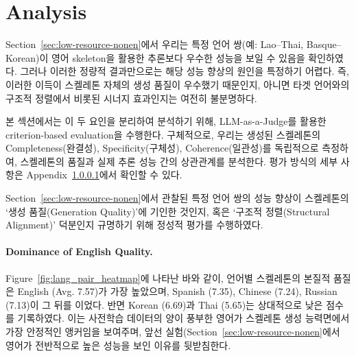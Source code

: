 \section{Analysis}

Section~\ref{sec:low-resource-nonen}에서 우리는 특정 언어 쌍(예: Lao--Thai, Basque--Korean)이 영어 skeleton을 활용한 추론보다 우수한 성능을 보일 수 있음을 확인하였다. 그러나 이러한 정량적 결과만으로는 해당 성능 향상의 원인을 특정하기 어렵다. 즉, 이러한 이득이 스켈레톤 자체의 생성 품질이 우수했기 때문인지, 아니면 타겟 언어와의 구조적 정렬에서 비롯된 시너지 효과인지는 여전히 불분명하다.

본 섹션에서는 이 두 요인을 분리하여 분석하기 위해, LLM-as-a-Judge를 활용한 criterion-based evaluation을 수행한다. 구체적으로, 우리는 생성된 스켈레톤의 Completeness(완결성), Specificity(구체성), Coherence(일관성)를 독립적으로 측정하여, 스켈레톤의 품질과 실제 추론 성능 간의 상관관계를 분석한다. 평가 방식의 세부 사항은 Appendix~\ref{}에서 확인할 수 있다.


Section~\ref{sec:low-resource-nonen}에서 관찰된 특정 언어 쌍의 성능 향상이 스켈레톤의 `생성 품질(Generation Quality)'에 기인한 것인지, 혹은 `구조적 정렬(Structural Alignment)' 덕분인지 규명하기 위해 정성적 평가를 수행하였다.


\paragraph{Dominance of English Quality.} 
Figure~\ref{fig:lang_pair_heatmap}에 나타난 바와 같이, 언어별 스켈레톤의 본질적 품질은 English (Avg. 7.57)가 가장 높았으며, Spanish (7.35), Chinese (7.24), Russian (7.13)이 그 뒤를 이었다. 반면 Korean (6.69)과 Thai (5.65)는 상대적으로 낮은 점수를 기록하였다. 이는 사전학습 데이터의 양이 풍부한 영어가 스켈레톤 생성 능력면에서 가장 안정적인 앵커임을 보여주며, 앞선 실험(Section~\ref{sec:low-resource-nonen}에서 영어가 전반적으로 높은 성능을 보인 이유를 뒷받침한다.

